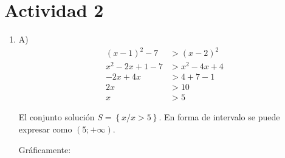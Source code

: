 \documentclass{article}
\begin{document}
\section*{Actividad 2}
\begin{enumerate}
	\item[] A) 
	\begin{align*}
		(x-1)^{2} - 7 &> (x-2)^{2}\\
		x^2 - 2x +1 - 7 &> x^2 -4x +4\\
		-2x+4x &> 4+7-1\\
		2x &> 10\\
		x &> 5
	\end{align*}

	El conjunto solución $S=\left\{ x / x > 5 \right\}$. 
	En forma de intervalo se puede expresar como $(5;+\infty)$.

	Gráficamente:
	\vspace{1cm}


\end{enumerate}
\end{document}
